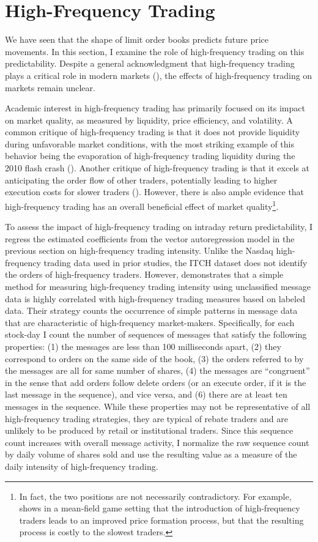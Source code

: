 \section{High-Frequency Trading}
	We have seen that the shape of limit order books predicts future price movements. In this section, I examine the role of high-frequency trading on this predictability. Despite a general acknowledgment that high-frequency trading plays a critical role in modern markets (\citet{OHara2015}), the effects of high-frequency trading on markets remain unclear.

	Academic interest in high-frequency trading has primarily focused on its impact on market quality, as measured by liquidity, price efficiency, and volatility. A common critique of high-frequency trading is that it does not provide liquidity during unfavorable market conditions, with the most striking example of this behavior being the evaporation of high-frequency trading liquidity during the 2010 flash crash (\citet{Kirilenko2015}). Another critique of high-frequency trading is that it excels at anticipating the order flow of other traders, potentially leading to higher execution costs for slower traders (\citet{Hirschey2013}). However, there is also ample evidence that high-frequency trading has an overall beneficial effect of market quality\footnote{In fact, the two positions are not necessarily contradictory. For example, \citet{Lachapelle2013} shows in a mean-field game setting that the introduction of high-frequency traders leads to an improved price formation process, but that the resulting process is costly to the slowest traders.}.

	To assess the impact of high-frequency trading on intraday return predictability, I regress the estimated coefficients from the vector autoregression model in the previous section on high-frequency trading intensity. Unlike the Nasdaq high-frequency trading data used in prior studies, the ITCH dataset does not identify the orders of high-frequency traders. However, \citet{Hasbrouck2013} demonstrates that a simple method for measuring high-frequency trading intensity using unclassified message data is highly correlated with high-frequency trading measures based on labeled data. Their strategy counts the occurrence of simple patterns in message data that are characteristic of high-frequency market-makers. Specifically, for each stock-day I count the number of sequences of messages that satisfy the following properties: (1) the messages are less than 100 milliseconds apart, (2) they correspond to orders on the same side of the book, (3) the orders referred to by the messages are all for same number of shares, (4) the messages are ``congruent'' in the sense that add orders follow delete orders (or an execute order, if it is the last message in the sequence), and vice versa, and (6) there are at least ten messages in the sequence. While these properties may not be representative of all high-frequency trading strategies, they are typical of rebate traders and are unlikely to be produced by retail or institutional traders. Since this sequence count increases with overall message activity, I normalize the raw sequence count by daily volume of shares sold and use the resulting value as a measure of the daily intensity of high-frequency trading.

